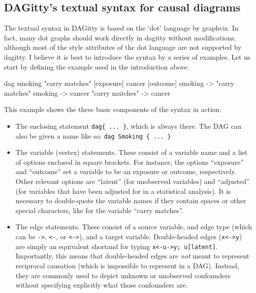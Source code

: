 \documentclass[a4paper]{article} %
\newcommand{\pp}{{\sc DAG}itty\xspace}
\begin{document}
\subsection{\pp's textual syntax for causal diagrams} 

The textual syntax in DAGitty is based on the ‘dot’ language by graphviz. In fact, many dot graphs should work directly in dagitty without modifications, although most of the style attributes of the dot language are not supported by dagitty.
I believe it is best to introduce the syntax by a series of examples. Let us start by defining the example used in the introduction above.

\begin{dagcode}
dag{ 
  smoking
  "carry matches" [exposure]
  cancer [outcome]
  smoking -> "carry matches"
  smoking -> cancer
  "carry matches" -> cancer
}
\end{dagcode}

This example shows the three basic components of the syntax in action:
\begin{itemize}
\item The enclosing statement \verb'dag{ ... }', which is always there. The DAG can also be given a name like so: \verb'dag Smoking { ... }'

\item The variable (vertex) statements. These consist of a variable name and a list of options enclosed in square brackets. For instance, the options ``exposure'' and ``outcome'' set a variable to be an exposure or outcome, respectively. Other relevant options are ``latent'' (for unobserved variables) and ``adjusted'' (for variables that have been adjusted for in a statistical analysis). It is necessary to double-quote the variable names if they contain spaces or other special characters, like for the variable ``carry matches''.

\item The edge statements. These consist of a source variable, and edge type (which can be  \verb|->|, \verb|<-|, or \verb|<->|), and a target variable. Double-headed edges (\verb|x<->y|) are simply an equivalent shortand for typing \verb|x<-u->y; u[latent]|. Importantly, this means that double-headed edges are \emph{not} meant to represent reciprocal causation (which is impossible to represent in a DAG). Instead, they are commonly used to depict unknown or unobserved confounders without specifying explicitly what those confounders are. 
\end{itemize}
\end{document}
